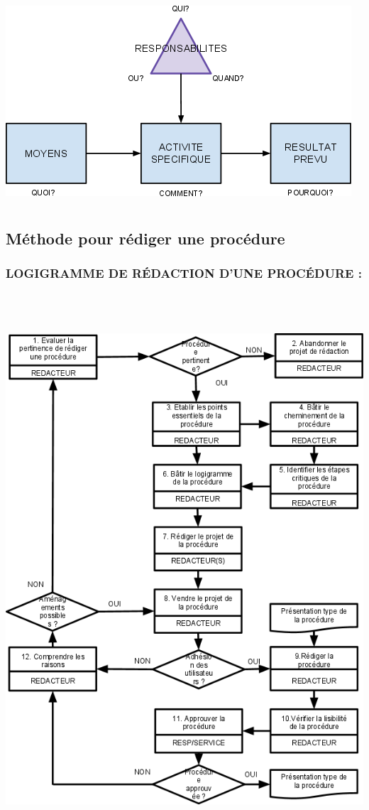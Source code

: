 \documentclass{mise_en_page}
\begin{document}
 \includegraphics[width=12.885cm,height=7.673cm]{BP1-img1.png} 

\subsection{Méthode pour
rédiger une procédure}

\subsubsection[LOGIGRAMME DE RÉDACTION D’UNE PROCÉDURE :]{LOGIGRAMME DE
RÉDACTION D’UNE PROCÉDURE :}

 \includegraphics[width=15.637cm,height=20.535cm]{BP1-img2.png} 
\end{document}

